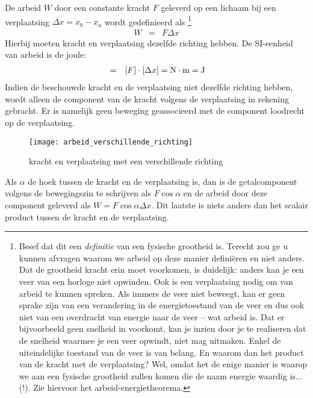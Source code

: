 De arbeid $W$ door een constante kracht $F$ geleverd op een lichaam bij een verplaatsing $\Delta x=x_b-x_a$ wordt gedefinieerd als \footnote{Besef dat dit een \textit{definitie} van een fysische grootheid is. Terecht zou ge u kunnen afvragen waarom we arbeid op deze manier defini\"eren en niet anders. Dat de grootheid kracht erin moet voorkomen, is duidelijk: anders kan je een veer van een horloge niet opwinden. Ook is een verplaatsing nodig om van arbeid te kunnen spreken. Als immers de veer niet beweegt, kan er geen sprake zijn van een verandering in de energietoestand van de veer en dus ook niet van een overdracht van energie naar de veer -- wat arbeid is. Dat er bijvoorbeeld geen snelheid in voorkomt, kan je inzien door je te realiseren dat de snelheid waarmee je een veer opwindt, niet mag uitmaken. Enkel de uiteindelijke toestand van de veer is van belang. En waarom dan het product van de kracht met de verplaatsing? Wel, omdat het de enige manier is waarop we aan een fysische grootheid zullen komen die de naam energie waardig is... (!). Zie hiervoor het arbeid-energietheorema.}
\begin{eqnarray}
W&=&F\Delta x
\end{eqnarray}
Hierbij moeten kracht en verplaatsing dezelfde richting hebben. De SI-eenheid van arbeid is de joule:
\begin{eqnarray*}
[W]&=&[F]\cdot[\Delta x]=\rm N\cdot m=J
\end{eqnarray*}
Indien de beschouwde kracht en de verplaatsing niet dezelfde richting hebben, wordt alleen de component van de kracht volgens de verplaatsing in rekening gebracht. Er is namelijk geen beweging geassocieerd met de component loodrecht op de verplaatsing.
\begin{figure}[h]
\begin{center}
\texttt{[image: arbeid\_verschillende\_richting]}
\caption{kracht en verplaatsing met een verschillende richting}
\end{center}
\end{figure}

Als $\alpha$ de hoek tussen de kracht en de verplaatsing is, dan is de getalcomponent volgens de bewegingszin te schrijven als $F\cos{\alpha}$ en de arbeid door deze component geleverd als $W=F\cos{\alpha}\Delta x$. Dit laatste is niets anders dan het scalair product tussen de kracht en de verplaatsing.

